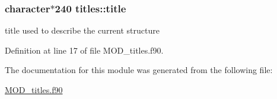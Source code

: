\hypertarget{classtitles_a76fe5ce9f23ba95b51adc3b9c65c194e}{
\subsubsection[{title}]{\setlength{\rightskip}{0pt plus 5cm}character$\ast$240 titles\-::title}}\label{classtitles_a76fe5ce9f23ba95b51adc3b9c65c194e}


title used to describe the current structure 



Definition at line 17 of file M\-O\-D\-\_\-titles.\-f90.



The documentation for this module was generated from the following file\-:\begin{DoxyCompactItemize}
\item 
\hyperlink{MOD__titles_8f90}{M\-O\-D\-\_\-titles.\-f90}\end{DoxyCompactItemize}
